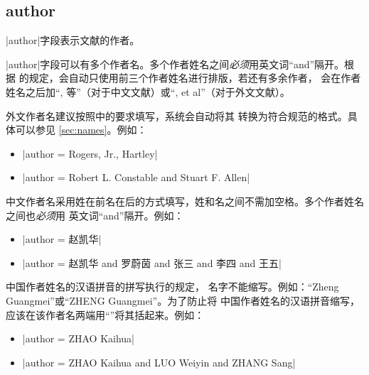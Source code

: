 
\subsection{author}\label{subsec:bibfield-author}

|author|字段表示文献的作者。

|author|字段可以有多个作者名。多个作者姓名之间\emph{必须}用英文词``and''隔开。根据
\cite{gbt7714-2005}的规定，{\BibTeX}会自动只使用前三个作者姓名进行排版，若还有多余作者，
会在作者姓名之后加``, 等''（对于中文文献）或``, et al''（对于外文文献）。

外文作者名建议按照\cite[157]{lamport1994latex}中的要求填写，{\BibTeX}系统会自动将其
转换为符合规范\cite{gbt7714-2005}的格式。具体可以参见
\ref{sec:names}。例如：
\begin{itemize}
\item |author = {Rogers, Jr., Hartley}|
\item |author = {Robert L. Constable and Stuart F. Allen}|
\end{itemize}

中文作者名采用姓在前名在后的方式填写，姓和名之间不需加空格。多个作者姓名之间也\emph{必须}用
英文词``and''隔开。例如：
\begin{itemize}
\item |author = {赵凯华}|
\item |author = {赵凯华 and 罗蔚茵 and 张三 and 李四 and 王五}|
\end{itemize}

中国作者姓名的汉语拼音的拼写执行的规定\cite{gbt16159-2012}，
名字不能缩写。例如：``Zheng Guangmei''或``ZHENG Guangmei''。为了防止{\BibTeX}将
中国作者姓名的汉语拼音缩写，应该在该作者名两端用``{}''将其括起来。例如：
\begin{itemize}
\item |author = {{ZHAO Kaihua}}|
\item |author = {{ZHAO Kaihua} and {LUO Weiyin} and {ZHANG Sang}}|
\end{itemize}

